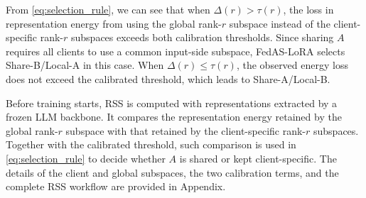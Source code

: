 \documentclass[lettersize,journal]{IEEEtran}
\begin{document}
From \eqref{eq:selection_rule}, {\color{black}we can see that} when $\Delta(r)>\tau(r)$, the loss in representation energy from using the global rank-$r$ subspace instead of the client-specific rank-$r$ subspaces exceeds both calibration thresholds. Since sharing $A$ requires all clients to use a common input-side subspace, FedAS-LoRA selects Share-B/Local-A in this case. When $\Delta(r)\le\tau(r)$, the observed energy loss does not exceed the calibrated threshold, which leads to Share-A/Local-B.

Before training starts, RSS is computed with representations extracted by a frozen LLM backbone. It compares the representation energy retained by the global rank-$r$ subspace with that retained by the client-specific rank-$r$ subspaces. Together with the calibrated threshold, such comparison is used in \eqref{eq:selection_rule} to decide whether $A$ is shared or kept client-specific. {\color{black}The details of the client and global subspaces, the two calibration terms, and the complete RSS workflow are provided in Appendix.}

\end{document}

